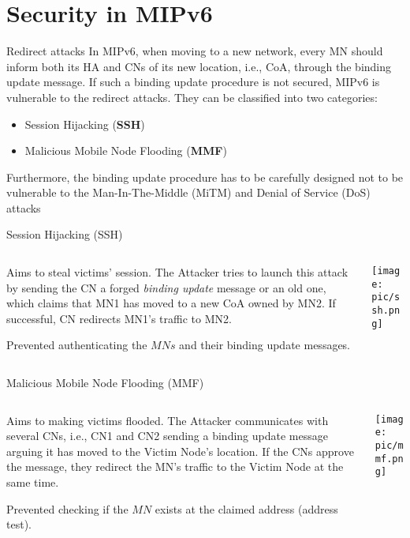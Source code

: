 \documentclass[10pt]{beamer}
\begin{document}
\section{Security in MIPv6}
\begin{frame}{Redirect attacks}
	In MIPv6, when moving to a new network, every MN should inform both its HA and CNs of its new location, i.e., CoA, through the binding update message. If such a binding update procedure is not secured, MIPv6 is vulnerable to the \alert{redirect attacks}. They can be classified into two categories: \begin{itemize}
		\item Session Hijacking	(\alert{\textbf{SSH}})
		\item Malicious Mobile Node Flooding (\alert{\textbf{MMF}})
	\end{itemize}
	Furthermore, the binding update procedure has to be carefully designed not to be vulnerable to	the Man-In-The-Middle (MiTM) and Denial of Service (DoS) attacks
\end{frame}
\begin{frame}{Session Hijacking (SSH)}
	\begin{columns}[T]
		\begin{column}{0.48\textwidth}
			\vspace{0.6cm}
				Aims to steal victims’ session. The Attacker tries to launch this attack by sending the CN a forged \textit{binding update} message or an old one, which claims that MN1 has moved to a new CoA owned by MN2. If successful, CN redirects MN1’s traffic to MN2. \par Prevented authenticating the $MNs$ and their binding update messages.
		\end{column}
		\begin{column}{0.48\textwidth}
			\begin{center}
				\texttt{[image: pic/ssh.png]}
			\end{center}
		\end{column}
	\end{columns}
\end{frame}
\begin{frame}{Malicious Mobile Node Flooding (MMF)}
	\begin{columns}[T]
		\begin{column}{0.48\textwidth}
			Aims to making victims flooded. The Attacker communicates with several CNs, i.e., CN1 and CN2 sending a binding update message arguing it has moved to the Victim Node’s location. If the CNs approve the message, they redirect the MN’s traffic to the Victim Node at the same time. \par Prevented checking if the $MN$ exists at the claimed address (\alert{address test}).

		\end{column}
		\begin{column}{0.48\textwidth}
			\begin{center}
				\texttt{[image: pic/mmf.png]}
			\end{center}
		\end{column}
	\end{columns}
\end{frame}
\end{document}
